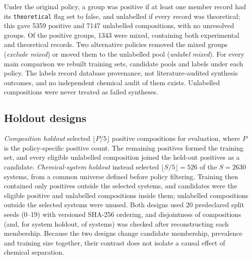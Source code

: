 \documentclass[11pt,a4paper]{article}
\begin{document}
Under the original policy, a group was positive if at least one member record had its \texttt{theoretical} flag set to false, and unlabelled if every record was theoretical; this gave \num{5359} positive and \num{7147} unlabelled compositions, with no unresolved groups. Of the positive groups, \num{1343} were mixed, containing both experimental and theoretical records. Two alternative policies removed the mixed groups (\emph{exclude mixed}) or moved them to the unlabelled pool (\emph{unlabel mixed}). For every main comparison we rebuilt training sets, candidate pools and labels under each policy. The labels record database provenance, not literature-audited synthesis outcomes, and no independent chemical audit of them exists. Unlabelled compositions were never treated as failed syntheses.

\subsection{Holdout designs}
\emph{Composition holdout} selected $\lfloor P/5 \rfloor$ positive compositions for evaluation, where $P$ is the policy-specific positive count. The remaining positives formed the training set, and every eligible unlabelled composition joined the held-out positives as a candidate. \emph{Chemical-system holdout} instead selected $\lfloor S/5 \rfloor = 526$ of the $S = \num{2630}$ systems, from a common universe defined before policy filtering. Training then contained only positives outside the selected systems, and candidates were the eligible positive and unlabelled compositions inside them; unlabelled compositions outside the selected systems were unused. Both designs used 20 predeclared split seeds (0--19) with versioned SHA-256 ordering, and disjointness of compositions (and, for system holdout, of systems) was checked after reconstructing each membership. Because the two designs change candidate membership, prevalence and training size together, their contrast does not isolate a causal effect of chemical separation.
\end{document}
